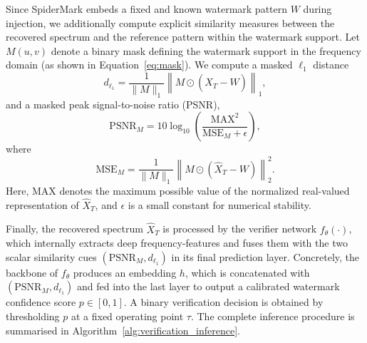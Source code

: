 \documentclass[lettersize,journal,review]{IEEEtran}
\begin{document}
Since SpiderMark embeds a fixed and known watermark pattern $W$ during injection, we additionally compute explicit similarity measures between the recovered spectrum and the reference pattern within the watermark support.
Let $M(u,v)$ denote a binary mask defining the watermark support in the frequency domain (as shown in Equation~\ref{eq:mask}).
We compute a masked $\ell_1$ distance
\begin{equation}
    d_{\ell_1} = \frac{1}{\|M\|_1}\left\| M \odot \left(\hat{X}_T - W\right) \right\|_1,
\end{equation}
and a masked peak signal-to-noise ratio (PSNR),
\begin{equation}
    \mathrm{PSNR}_M = 10 \log_{10}\!\left( \frac{\mathrm{MAX}^2}{\mathrm{MSE}_M + \epsilon} \right),
\end{equation}
where
\begin{equation}
    \mathrm{MSE}_M = \frac{1}{\|M\|_1}\left\| M \odot \left(\hat{X}_T - W\right) \right\|_2^2.
\end{equation}
Here, $\mathrm{MAX}$ denotes the maximum possible value of the normalized real-valued representation of $\hat{X}_T$, and $\epsilon$ is a small constant for numerical stability.

Finally, the recovered spectrum $\hat{X}_T$ is processed by the verifier network $f_\theta(\cdot)$, which internally extracts deep frequency-features and fuses them with the two scalar similarity cues $(\mathrm{PSNR}_M, d_{\ell_1})$ in its final prediction layer.
Concretely, the backbone of $f_\theta$ produces an embedding $h$, which is concatenated with $(\mathrm{PSNR}_M, d_{\ell_1})$ and fed into the last layer to output a calibrated watermark confidence score $p \in [0,1]$.
A binary verification decision is obtained by thresholding $p$ at a fixed operating point $\tau$.
The complete inference procedure is summarised in Algorithm~\ref{alg:verification_inference}.
\end{document}
